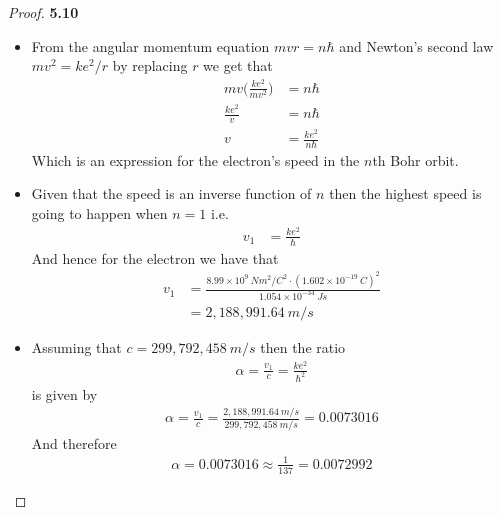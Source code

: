 \documentclass[11pt]{article}
\theoremstyle{definition}
\begin{document}
\begin{proof}{\textbf{5.10}}
\begin{itemize}
    \item [(a)] From the angular momentum equation $mvr = n\hbar$ and Newton's
    second law $mv^2 = ke^2/r$ by replacing $r$ we get that
    \begin{align*}
        mv\bigg(\frac{ke^2}{mv^2}\bigg) &= n\hbar\\
        \frac{ke^2}{v} &= n\hbar\\
        v &= \frac{ke^2}{n\hbar}
    \end{align*}
    Which is an expression for the electron's speed in the $n$th Bohr orbit.
    \item [(b)] Given that the speed is an inverse function of $n$ then the
    highest speed is going to happen when $n = 1$ i.e.  
    \begin{align*}
        v_1 &= \frac{ke^2}{\hbar}
    \end{align*}
    And hence for the electron we have that
    \begin{align*}
        v_1 &= \frac{8.99\times 10^9~Nm^2/C^2\cdot (1.602 \times 10^{-19}~C)^2}
        {1.054\times 10^{-34}~Js}\\
        &= 2,188,991.64~m/s
    \end{align*}
    \item [(c)] Assuming that $c = 299,792,458~m/s$ then the ratio
    \begin{align*}
        \alpha = \frac{v_1}{c} = \frac{ke^2}{\hbar^2}
    \end{align*}
    is given by
    \begin{align*}
        \alpha = \frac{v_1}{c} = \frac{2,188,991.64~m/s}{299,792,458~m/s}
        = 0.0073016
    \end{align*}
    And therefore
    \begin{align*}
        \alpha = 0.0073016 \approx \frac{1}{137} = 0.0072992
    \end{align*}
\end{itemize}
\end{proof}
\cleardoublepage
\end{document}
